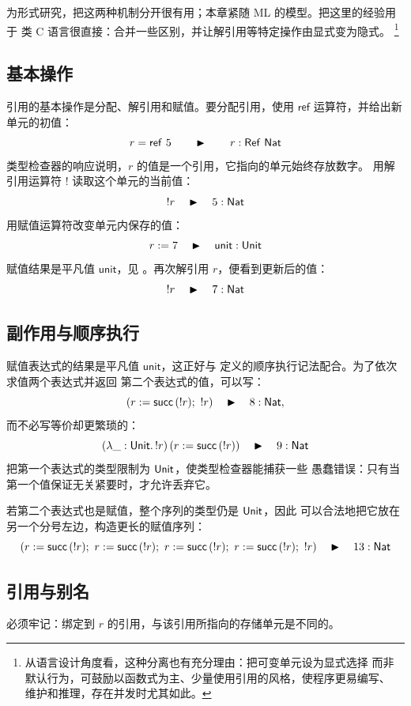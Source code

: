 为形式研究，把这两种机制分开很有用；本章紧随 ML 的模型。把这里的经验用于
类 C 语言很直接：合并一些区别，并让解引用等特定操作由显式变为隐式。
\footnote{从语言设计角度看，这种分离也有充分理由：把可变单元设为显式选择
而非默认行为，可鼓励以函数式为主、少量使用引用的风格，使程序更易编写、
维护和推理，存在并发时尤其如此。}

\subsection*{基本操作}

引用的基本操作是分配、解引用和赋值。要分配引用，使用
\(\mathsf{ref}\) 运算符，并给出新单元的初值：
\[
r=\mathsf{ref}\ 5
\qquad\blacktriangleright\qquad r:\tapltype{Ref}\ \tapltype{Nat}
\]
类型检查器的响应说明，\(r\) 的值是一个引用，它指向的单元始终存放数字。
用解引用运算符 \(!\) 读取这个单元的当前值：
\[
!r\quad\blacktriangleright\quad5:\mathsf{Nat}
\]
用赋值运算符改变单元内保存的值：
\[
r:=7\quad\blacktriangleright\quad\mathsf{unit}:\mathsf{Unit}
\]
赋值结果是平凡值 \(\mathsf{unit}\)，见 。再次解引用
\(r\)，便看到更新后的值：
\[
!r\quad\blacktriangleright\quad7:\mathsf{Nat}
\]

\subsection*{副作用与顺序执行}

赋值表达式的结果是平凡值 \(\mathsf{unit}\)，这正好与
 定义的顺序执行记法配合。为了依次求值两个表达式并返回
第二个表达式的值，可以写：
\[
(r:=\mathsf{succ}\,(!r);\ !r)
\quad\blacktriangleright\quad8:\mathsf{Nat},
\]
而不必写等价却更繁琐的：
\[
(\lambda\_:\mathsf{Unit}.\,!r)\,
(r:=\mathsf{succ}\,(!r))
\quad\blacktriangleright\quad9:\mathsf{Nat}
\]
把第一个表达式的类型限制为 \(\mathsf{Unit}\)，使类型检查器能捕获一些
愚蠢错误：只有当第一个值保证无关紧要时，才允许丢弃它。

若第二个表达式也是赋值，整个序列的类型仍是 \(\mathsf{Unit}\)，因此
可以合法地把它放在另一个分号左边，构造更长的赋值序列：
\[
(r:=\mathsf{succ}\,(!r);\ r:=\mathsf{succ}\,(!r);\
 r:=\mathsf{succ}\,(!r);\ r:=\mathsf{succ}\,(!r);\ !r)
\quad\blacktriangleright\quad13:\mathsf{Nat}
\]

\subsection*{引用与别名}

必须牢记：绑定到 \(r\) 的引用，与该引用所指向的存储单元是不同的。

